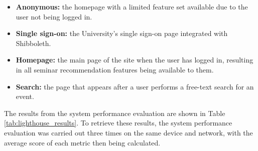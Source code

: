 \documentclass{l4proj}
\begin{document}
\begin{itemize}
    \item \textbf{Anonymous:} the homepage with a limited feature set available due to the user not being logged in.
    \item \textbf{Single sign-on:} the University's single sign-on page integrated with Shibboleth.
    \item \textbf{Homepage:} the main page of the site when the user has logged in, resulting in all seminar recommendation features being available to them.
    \item \textbf{Search:} the page that appears after a user performs a free-text search for an event.
\end{itemize}

The results from the system performance evaluation are shown in Table \ref{tab:lighthouse_results}. To retrieve these results, the system performance evaluation was carried out three times on the same device and network, with the average score of each metric then being calculated.

\begin{table}[htb]
    \caption{System performance results from Lighthouse's evaluation. The performance, accessibility and best practices columns have a maximum score of 100. Red indicates a poor score. Orange represents that the metric needs improved, and green demonstrates a good score.}\label{tab:lighthouse_results}
    \centering
\end{table}
\end{document}
